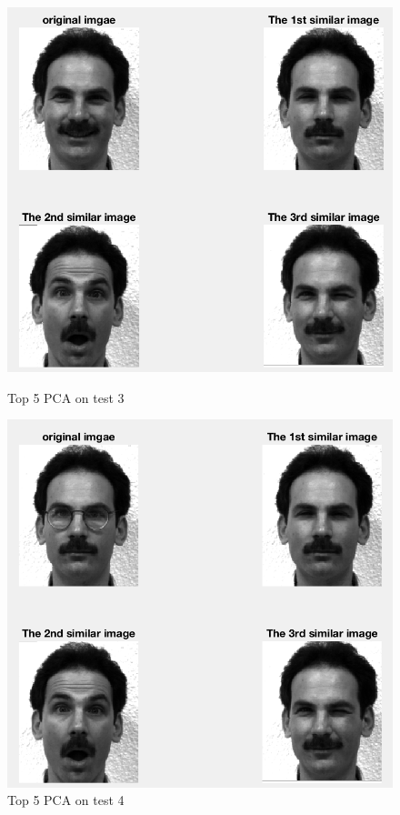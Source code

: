 \documentclass{article}
\begin{document}
\begin{figure}[htbp]
\centering
\begin{minipage}[t]{0.48\textwidth}
\centering
\includegraphics[scale = 0.3]{5_3.png}
\caption{Top 5 PCA on test 3}
\end{minipage}
\begin{minipage}[t]{0.48\textwidth}
\centering
\includegraphics[scale = 0.3]{5_4.png}
\caption{Top 5 PCA on test 4}
\end{minipage}
\end{figure}
\end{document}

